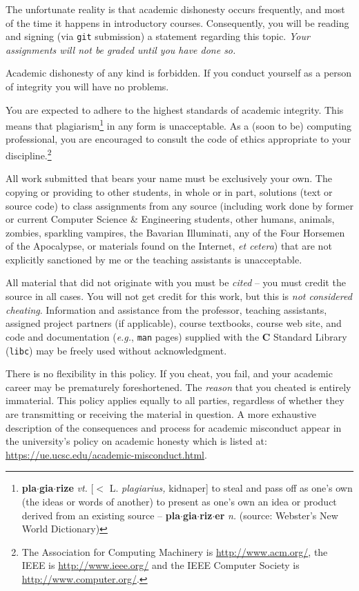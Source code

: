 \documentclass{article}
\begin{document}
The unfortunate reality is that academic dishonesty occurs frequently, and most
of the time it happens in introductory courses. Consequently, you will be
reading and signing (via \texttt{git} submission) a statement regarding this
topic. \emph{Your assignments will not be graded until you have done so.}

Academic dishonesty of any kind is forbidden. If you conduct yourself as a
person of integrity you will have no problems.

You are expected to adhere to the highest standards of academic
integrity.
This means that plagiarism\footnote{{\bf pla$\cdot$gia$\cdot$rize} {\em vt.}
[$<$ L. {\em plagiarius,} kidnaper] to steal and pass off as one's own
(the ideas or words of another) to present as one's own an idea or product
derived from an existing source -- {\bf pla$\cdot$gia$\cdot$riz$\cdot$er}
{\em n.} (source: Webster's New World Dictionary)}
in any form is unacceptable.
As a (soon to be) computing
professional, you are encouraged to consult the code of ethics
appropriate to your discipline.\footnote{The Association for Computing Machinery
is \url{http://www.acm.org/}, the IEEE is
\url{http://www.ieee.org/} and the IEEE Computer
Society is \url{http://www.computer.org/}.}

All work submitted that bears your name must be exclusively your own.
The copying or providing to other students, in whole or in part,
solutions (text or source code) to class assignments from any source
(including work done by former or current Computer Science \& Engineering students,
other humans, animals, zombies, sparkling vampires, the Bavarian Illuminati,
any of the Four Horsemen of the Apocalypse, or materials found
on the Internet, \emph{et cetera}) that are not explicitly sanctioned by me or
the teaching assistants is unacceptable.

All material that did not originate with you must be \emph{cited}
-- you must credit the source in all cases. You will not get credit
for this work, but this is \emph{not considered cheating}. Information and
assistance from the professor, teaching assistants, assigned project partners (if applicable),
course textbooks, course web site, and code and documentation
(\emph{e.g.}, \texttt{man} pages) supplied with the \textbf{C} Standard Library
(\texttt{libc}) may be freely used without acknowledgment.

There is no flexibility in this policy. If you cheat, you fail, and
your academic career may be prematurely foreshortened. The
\emph{reason} that you cheated is entirely immaterial. This policy
applies equally to all parties, regardless of whether they are
transmitting or receiving the material in question. A more exhaustive description
of the consequences and process for academic misconduct
appear in the university's policy on academic honesty which is listed at:
\url{https://ue.ucsc.edu/academic-misconduct.html}.
\end{document}
